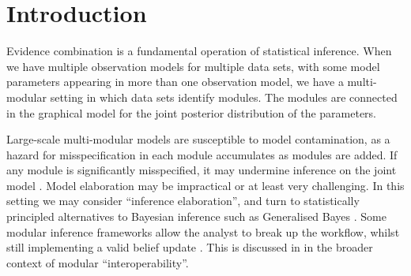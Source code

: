 


\section{Introduction} \label{sec:intro}

Evidence combination is a fundamental operation of statistical inference.
When we have multiple observation models for multiple data sets, with some model parameters appearing in more than one observation model, we have a multi-modular setting in which data sets identify modules.
The modules are connected in the graphical model for the joint posterior distribution of the parameters.

Large-scale multi-modular models are susceptible to model contamination, as a hazard for misspecification in each module accumulates as modules are added.
If any module is significantly misspecified, it may undermine inference on the joint model \citep{Liu2009modularization}.
Model elaboration \citep{Smith1986,Gelman2014BDA3} may be impractical or at least very challenging.
In this setting we may consider ``inference elaboration'', and turn to statistically principled alternatives to Bayesian inference such as Generalised Bayes \citep{Zhang2006,Grunwald2017a,Bissiri2016}.
Some modular inference frameworks allow the analyst to break up the workflow, whilst still implementing a valid belief update \citep{Bissiri2016,Nicholls2022smi}.
This is discussed in \cite{Nicholson2021covid} in the broader context of modular ``interoperability''.

